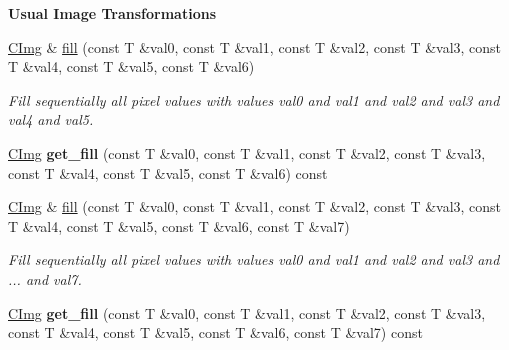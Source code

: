 \begin{Indent}{\bf Usual Image Transformations}
\begin{DoxyCompactItemize}
\item 
\hyperlink{structcimg__library_1_1_c_img}{CImg} \& \hyperlink{structcimg__library_1_1_c_img_aae9c53b0947eb5ed2d948d28b2de6a6e}{fill} (const T \&val0, const T \&val1, const T \&val2, const T \&val3, const T \&val4, const T \&val5, const T \&val6)
\begin{DoxyCompactList}\small\item\em Fill sequentially all pixel values with values {\itshape val0\/} and {\itshape val1\/} and {\itshape val2\/} and {\itshape val3\/} and {\itshape val4\/} and {\itshape val5\/}. \item\end{DoxyCompactList}\item 
\hypertarget{structcimg__library_1_1_c_img_a789ffc0a25c6fd2901befd966bc0f770}{
\hyperlink{structcimg__library_1_1_c_img}{CImg} {\bfseries get\_\-fill} (const T \&val0, const T \&val1, const T \&val2, const T \&val3, const T \&val4, const T \&val5, const T \&val6) const }
\label{structcimg__library_1_1_c_img_a789ffc0a25c6fd2901befd966bc0f770}

\item 
\hyperlink{structcimg__library_1_1_c_img}{CImg} \& \hyperlink{structcimg__library_1_1_c_img_ac804653aeaa4de7f445dd0c9454d28c1}{fill} (const T \&val0, const T \&val1, const T \&val2, const T \&val3, const T \&val4, const T \&val5, const T \&val6, const T \&val7)
\begin{DoxyCompactList}\small\item\em Fill sequentially all pixel values with values {\itshape val0\/} and {\itshape val1\/} and {\itshape val2\/} and {\itshape val3\/} and {\itshape \/}... and {\itshape val7\/}. \item\end{DoxyCompactList}\item 
\hypertarget{structcimg__library_1_1_c_img_a61f7b8db6e6adb67d5df15f50fba528d}{
\hyperlink{structcimg__library_1_1_c_img}{CImg} {\bfseries get\_\-fill} (const T \&val0, const T \&val1, const T \&val2, const T \&val3, const T \&val4, const T \&val5, const T \&val6, const T \&val7) const }
\label{structcimg__library_1_1_c_img_a61f7b8db6e6adb67d5df15f50fba528d}


\end{DoxyCompactItemize}
\end{Indent}
